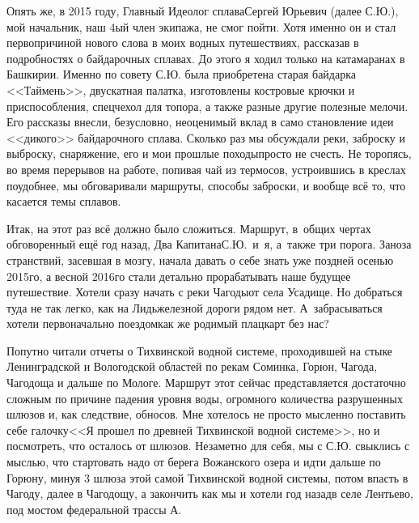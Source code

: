 Опять же, в 2015 году, Главный Идеолог сплава\mdash Сергей Юрьевич (далее С.Ю.), мой начальник, наш 4\sdash ый член экипажа, не смог пойти. Хотя именно он и стал первопричиной нового слова в моих водных путешествиях, рассказав в подробностях о байдарочных сплавах. До этого я ходил только на катамаранах в Башкирии. Именно по совету С.Ю. была приобретена старая байдарка <<Таймень>>, двускатная палатка, изготовлены костровые крючки и приспособления, спецчехол для топора, а также разные другие полезные мелочи. Его рассказы внесли, безусловно, неоценимый вклад в само становление идеи <<дикого>> байдарочного сплава. Сколько раз мы обсуждали реки, заброску и выброску, снаряжение, его и мои прошлые походы\mdash просто не счесть. Не торопясь, во время перерывов на работе, попивая чай из термосов, устроившись в креслах поудобнее, мы обговаривали маршруты, способы заброски, и вообще всё то, что касается темы сплавов.

Итак, на этот раз всё должно было сложиться. Маршрут, в~общих чертах обговоренный ещё год назад, Два Капитана\mdash С.Ю.~и~я, а~также три порога. Заноза странствий, засевшая в мозгу, начала давать о себе знать уже поздней осенью 2015\sdash го, а весной 2016\sdash го стали детально прорабатывать наше будущее путешествие. Хотели сразу начать с реки Чагоды\mdash от села Усадище. Но добраться туда не так легко, как на Лидь\mdash железной дороги рядом нет. А~забрасываться хотели первоначально поездом\mdash как же родимый плацкарт без нас? 

Попутно читали отчеты о Тихвинской водной системе, проходившей на стыке Ленинградской и Вологодской областей по рекам Соминка, Горюн, Чагода, Чагодоща и дальше по Мологе. Маршрут этот сейчас представляется достаточно сложным по причине падения уровня воды, огромного количества разрушенных шлюзов и, как следствие, обносов. Мне хотелось не просто мысленно поставить себе галочку\mdash <<Я прошел по древней Тихвинской водной системе>>, но и посмотреть, что осталось от шлюзов. Незаметно для себя, мы с С.Ю. свыклись с мыслью, что стартовать надо от берега Вожанского озера и идти дальше по Горюну, минуя 3 шлюза этой самой Тихвинской водной системы, потом впасть в Чагоду, далее в Чагодощу, а закончить как мы и хотели год назад\mdash в селе Лентьево, под мостом федеральной трассы А.

